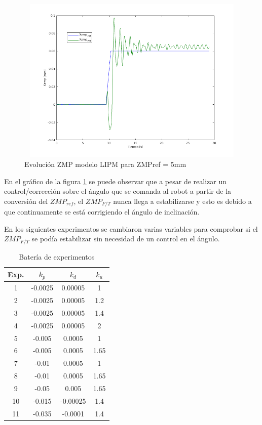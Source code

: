 
\begin{figure}[H]
\centering
\includegraphics[width=13cm, height=8cm]{imagenes/apartado_5/5.1/54_evolucion_zmpref_5mm}
\caption{Evolución ZMP modelo LIPM para ZMPref = 5mm}
\label{figura54}
\end{figure}

En el gráfico de la figura \ref{figura54} se puede observar que a pesar de realizar un control/corrección sobre el ángulo que se comanda al robot a partir de la conversión del $ZMP_{ref}$, el $ZMP_{F/T}$ nunca llega a estabilizarse y esto es debido a que continuamente se está corrigiendo el ángulo de inclinación.

En los siguientes experimentos se cambiaron varias variables para comprobar si el $ZMP_{F/T}$ se podía estabilizar sin necesidad de un control en el ángulo.

\begin{table}[H]
\begin{center}
\begin{tabular}{|c|c|c|c|}
\hline
Exp. & $k_p$    & $k_d$    & $k_u$ \\ \hline
1    & -0.0025 & 0.00005  & 1    \\ \hline
2    & -0.0025 & 0.00005  & 1.2  \\ \hline
3    & -0.0025 & 0.00005  & 1.4  \\ \hline
4    & -0.0025 & 0.00005  & 2    \\ \hline
5    & -0.005  & 0.0005   & 1    \\ \hline
6    & -0.005  & 0.0005   & 1.65 \\ \hline
7    & -0.01   & 0.0005   & 1    \\ \hline
8    & -0.01   & 0.0005   & 1.65 \\ \hline
9    & -0.05   & 0.005    & 1.65 \\ \hline
10   & -0.015  & -0.00025 & 1.4  \\ \hline
11   & -0.035  & -0.0001  & 1.4  \\ \hline
\end{tabular}
\end{center}
\caption{Batería de experimentos}
\label{tabla51}
\end{table}


